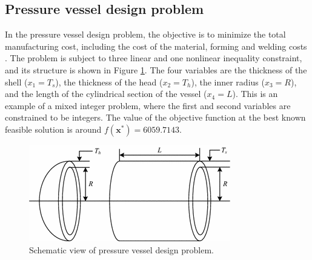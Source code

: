 
\subsection*{Pressure vessel design problem}

In the pressure vessel design problem, the objective is to minimize the total manufacturing cost, including the cost of the material, forming and welding costs \citep{PV}. The problem is subject to three linear and one nonlinear inequality constraint, and its structure is shown in Figure \ref{fig:PV}. The four variables are the thickness of the shell ($x_1 = T_s$), the thickness of the head ($x_2 = T_h$), the inner radius ($x_3 = R$), and the length of the cylindrical section of the vessel ($x_4 = L$). This is an example of a mixed integer problem, where the first and second variables are constrained to be integers. The value of the objective function at the best known feasible solution is around $f(\bm{x}^*) = 6059.7143$.

\begin{figure}[h]
    \begin{center}
    \includegraphics[scale=0.6]{Imgs/PV.png}
    \end{center}
    \captionsetup{justification=centering}
    \caption{Schematic view of pressure vessel design problem.}\label{fig:PV}
\end{figure}

